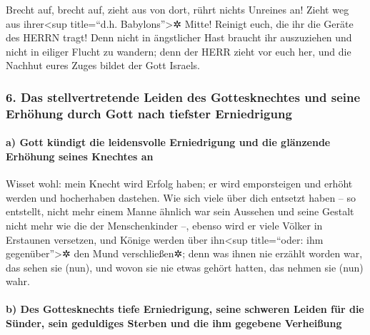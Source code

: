 Brecht auf, brecht auf, zieht aus von dort, rührt nichts
Unreines an! Zieht weg aus ihrer\textless sup title=``d.h.
Babylons''\textgreater✲ Mitte! Reinigt euch, die ihr die Geräte des
HERRN tragt! Denn nicht in ängstlicher Hast braucht ihr
auszuziehen und nicht in eiliger Flucht zu wandern; denn der HERR zieht
vor euch her, und die Nachhut eures Zuges bildet der Gott Israels.

\hypertarget{das-stellvertretende-leiden-des-gottesknechtes-und-seine-erhuxf6hung-durch-gott-nach-tiefster-erniedrigung}{%
\subsubsection{6. Das stellvertretende Leiden des Gottesknechtes und
seine Erhöhung durch Gott nach tiefster
Erniedrigung}\label{das-stellvertretende-leiden-des-gottesknechtes-und-seine-erhuxf6hung-durch-gott-nach-tiefster-erniedrigung}}

\hypertarget{a-gott-kuxfcndigt-die-leidensvolle-erniedrigung-und-die-gluxe4nzende-erhuxf6hung-seines-knechtes-an}{%
\paragraph{a) Gott kündigt die leidensvolle Erniedrigung und die
glänzende Erhöhung seines Knechtes
an}\label{a-gott-kuxfcndigt-die-leidensvolle-erniedrigung-und-die-gluxe4nzende-erhuxf6hung-seines-knechtes-an}}

Wisset wohl: mein Knecht wird Erfolg haben; er wird
emporsteigen und erhöht werden und hocherhaben dastehen.
Wie sich viele über dich entsetzt haben -- so entstellt,
nicht mehr einem Manne ähnlich war sein Aussehen und seine Gestalt nicht
mehr wie die der Menschenkinder --, ebenso wird er viele
Völker in Erstaunen versetzen, und Könige werden über ihn\textless sup
title=``oder: ihm gegenüber''\textgreater✲ den Mund verschließen✲; denn
was ihnen nie erzählt worden war, das sehen sie (nun), und wovon sie nie
etwas gehört hatten, das nehmen sie (nun) wahr.

\hypertarget{b-des-gottesknechts-tiefe-erniedrigung-seine-schweren-leiden-fuxfcr-die-suxfcnder-sein-geduldiges-sterben-und-die-ihm-gegebene-verheiuxdfung}{%
\paragraph{b) Des Gottesknechts tiefe Erniedrigung, seine schweren
Leiden für die Sünder, sein geduldiges Sterben und die ihm gegebene
Verheißung}\label{b-des-gottesknechts-tiefe-erniedrigung-seine-schweren-leiden-fuxfcr-die-suxfcnder-sein-geduldiges-sterben-und-die-ihm-gegebene-verheiuxdfung}}

